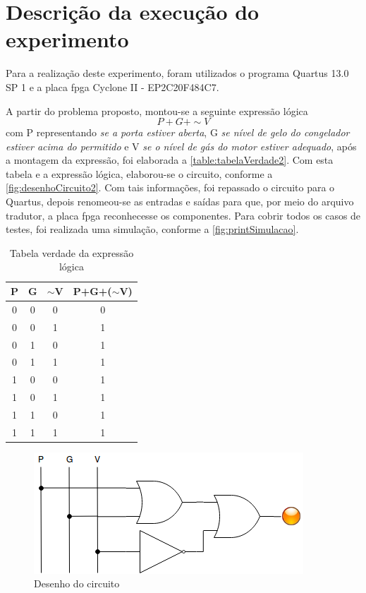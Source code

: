 
\chapter{Descrição da execução do experimento}
Para a realização deste experimento, foram utilizados o programa Quartus 13.0 SP 1 e a placa \ac{fpga}
Cyclone II - EP2C20F484C7.

A partir do problema proposto, montou-se a seguinte expressão lógica
$$ P + G + \sim V$$
com P representando \textit{se a porta estiver aberta}, G
\textit{se nível de gelo do congelador estiver acima do permitido} e V
\textit{se o nível de gás do motor estiver adequado}, após a
montagem da expressão, foi elaborada a \autoref{table:tabelaVerdade2}. Com esta tabela e a expressão lógica,
elaborou-se o circuito, conforme a \autoref{fig:desenhoCircuito2}. Com tais informações, foi repassado o circuito
para o Quartus, depois renomeou-se as entradas e saídas para que, por meio do arquivo tradutor, a placa
\ac{fpga} reconhecesse os componentes.
Para cobrir todos os casos de testes, foi realizada uma simulação, conforme a \autoref{fig:printSimulacao}.

\begin{table}[h]
	\centering
	\caption{Tabela verdade da expressão lógica}\label{table:tabelaVerdade2}
	\begin{tabular}{c|c|c|c}
		\textbf{P} & \textbf{G} & \textbf{$\sim$V} & \textbf{P+G+($\sim$V)} \\
		\hline
		0 & 0 & 0 & 0\\\hline
		0 & 0 & 1 & 1\\\hline
		0 & 1 & 0 & 1\\\hline
		0 & 1 & 1 & 1\\\hline
		1 & 0 & 0 & 1\\\hline
		1 & 0 & 1 & 1\\\hline
		1 & 1 & 0 & 1\\\hline
		1 & 1 & 1 & 1
	\end{tabular}
\end{table}

\begin{figure}[htb]
    \centering
	\caption{\label{fig:desenhoCircuito2}Desenho do circuito}
	\includegraphics{img/cenario2/desenhoCircuito}
\end{figure}


